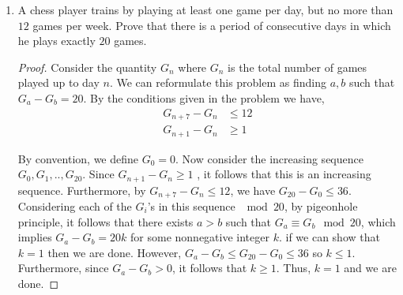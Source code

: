 \documentclass{article}
\begin{document}
\begin{enumerate}
\item  A chess player trains by playing at least one game per day, but no more than
$12$ games per week. Prove that there is a period of consecutive days in which he
plays exactly $20$ games.

\begin{proof}
Consider the quantity $G_n$ where $G_n$ is the total number of games played up to day $n$. We can reformulate this problem as finding $a, b$ such that $G_a - G_b = 20$. By the conditions given in the problem we have, 
\begin{align}
    G_{n+7} - G_n &\leq 12\\
    G_{n+1} - G_n &\geq 1
\end{align}

By convention, we define $G_0 = 0$. Now consider the increasing sequence $G_0, G_1,..,G_{20}$. Since $G_{n+1} - G_n \geq 1$ , it follows that this is an increasing sequence. Furthermore, by $ G_{n+7} - G_n \leq 12$, we have $G_{20} - G_0 \leq 36$. Considering each of the $G_i$'s in this sequence $\mod 20$, by pigeonhole principle, it follows that there exists $a > b$ such that $G_a \equiv G_b \mod 20$, which implies $G_a - G_b = 20k$ for some nonnegative integer $k$. if we can show that $k = 1$ then we are done. However, $G_a - G_b \leq G_{20} -G_0  \leq 36$ so $k \leq 1$. Furthermore, since $G_a - G_b > 0$, it follows that $k \geq 1$. Thus, $k = 1$ and we are done.  

\end{proof}

\end{enumerate}
\end{document}
